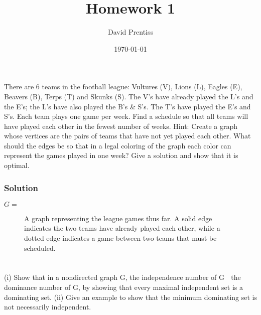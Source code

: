 \documentclass{amsart}
\author{David Prentiss}
\date{\today}
\title{Homework 1}
\begin{document}
\maketitle

\section{}
There are 6 teams in the football league: Vultures (V), Lions (L), Eagles (E),
Beavers (B), Terps (T) and Skunks (S).
The V's have already played the L's and the E's; the L's have also played the
B's \& S's.
The T's have played the E's and S's. Each team plays one game per week.
Find a schedule so that all teams will have played each other in the fewest
number of weeks.
Hint: Create a graph whose vertices are the pairs of teams that have not yet
played each other.
What should the edges be so that in a legal coloring of the graph each color can
represent the games played in one week?
Give a solution and show that it is optimal.

\subsubsection*{Solution}
$G = $
\begin{figure}[h]
  \caption{A graph representing the league games thus far. A solid edge
    indicates the two teams have already played each other, while a dotted edge
    indicates a game between two teams that must be scheduled.}
\end{figure}

\section{}

(i) Show that in a nondirected graph G, the independence number of G  the dominance
number of G, by showing that every maximal independent set is a dominating set.
(ii) Give an example to show that the minimum dominating set is not necessarily
independent.
\end{document}
